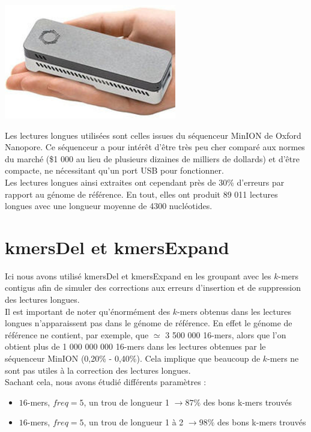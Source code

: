 \documentclass{report}
\begin{document}
      \begin{center}
        \includegraphics[height=50mm]{sequenceur_minion}
      \end{center}
      Les lectures longues utilisées sont celles issues du séquenceur MinION de Oxford Nanopore. Ce séquenceur a pour intérêt d'être très peu cher comparé aux normes du marché (\$1 000 au lieu de plusieurs dizaines de milliers de dollards) et d'être compacte, ne nécessitant qu'un port USB pour fonctionner.\\

      Les lectures longues ainsi extraites ont cependant près de 30\% d'erreurs par rapport au génome de référence. En tout, elles ont produit 89 011 lectures longues avec une longueur moyenne de 4300 nucléotides.
    \section{kmersDel et kmersExpand}
      Ici nous avons utilisé kmersDel et kmersExpand en les groupant avec les $k$-mers contigus afin de simuler des corrections aux erreurs d'insertion et de suppression des lectures longues.\\

      Il est important de noter qu'énormément des $k$-mers obtenus dans les lectures longues n'apparaissent pas dans le génome de référence. En effet le génome de référence ne contient, par exemple, que $\simeq$ 3 500 000 16-mers, alors que l'on obtient plus de 1 000 000 000 16-mers dans les lectures obtenues par le séquenceur MinION (0,20\% - 0,40\%). Cela implique que beaucoup de $k$-mers ne sont pas utiles à la correction des lectures longues.\\

      Sachant cela, nous avons étudié différents paramètres :
      \begin{itemize}
        \item $16$-mers, $freq = 5$, un trou de longueur 1 $\rightarrow 87\%$ des bons k-mers trouvés
        \item $16$-mers, $freq = 5$, un trou de longueur 1 à 2 $\rightarrow 98\%$ des bons k-mers trouvés
      \end{itemize}
\end{document}
